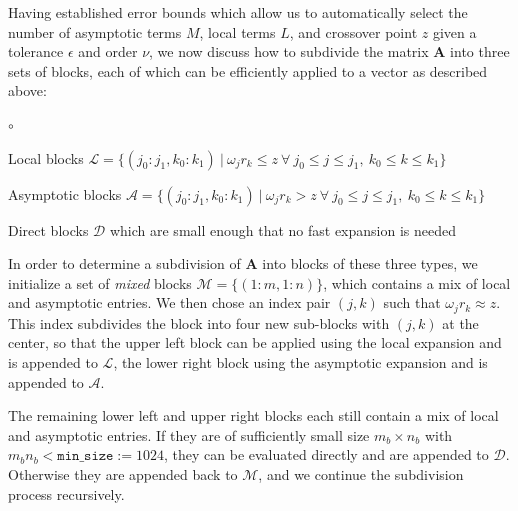 Having established error bounds which allow us to automatically select the
number of asymptotic terms $M$, local terms $L$, and crossover point $z$ given a
tolerance $\epsilon$ and order $\nu$, we now discuss how to subdivide the matrix
$\bm{A}$ into three sets of blocks, each of which can be efficiently applied to
a vector as described above:
\begin{list}{$\circ$}{}
    \item Local blocks $\mathscr{L} = \big\{ (j_0:j_1, k_0:k_1) \ | \ \omega_j
    r_k \leq z \ \forall \ j_0 \leq j \leq j_1, \ k_0 \leq k \leq k_1 \big\}$
    \item Asymptotic blocks $\mathscr{A} = \big\{ (j_0:j_1, k_0:k_1) \ | \
    \omega_j r_k > z \ \forall \ j_0 \leq j \leq j_1, \ k_0 \leq k \leq k_1
    \big\}$
    \item Direct blocks $\mathscr{D}$ which are small enough that no fast
    expansion is needed
\end{list}
In order to determine a subdivision of $\bm{A}$ into blocks of these three
types, we initialize a set of \textit{mixed} blocks $\mathscr{M} = \{(1:m,
1:n)\}$, which contains a mix of local and asymptotic entries. We then chose an
index pair $(j,k)$ such that $\omega_j r_k \approx z$. This index subdivides the
block into four new sub-blocks with $(j,k)$ at the center, so that the upper
left block can be applied using the local expansion and is appended to
$\mathscr{L}$, the lower right block using the asymptotic expansion and is
appended to $\mathscr{A}$. 

The remaining lower left and upper right blocks each still contain a mix of
local and asymptotic entries. If they are of sufficiently small size $m_b \times
n_b$ with $m_b n_b < \texttt{min\_size} := 1024$, they can be evaluated directly
and are appended to $\mathscr{D}$. Otherwise they are appended back to
$\mathscr{M}$, and we continue the subdivision process recursively. 

